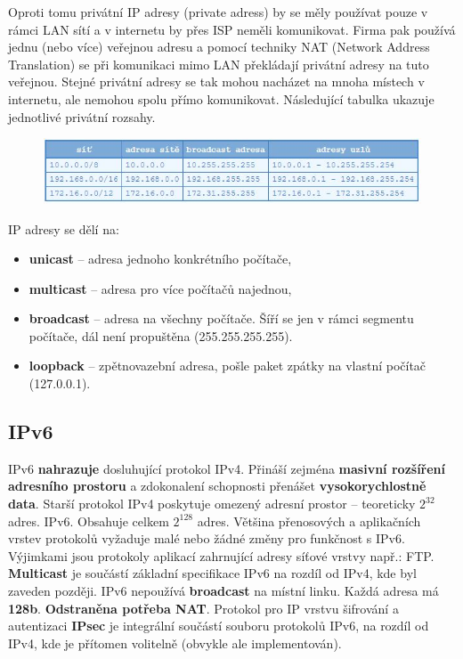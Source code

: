 Oproti tomu privátní IP adresy (private adress) by se měly používat pouze v rámci LAN sítí a v internetu by přes ISP neměli komunikovat. Firma pak používá jednu (nebo více) veřejnou adresu a pomocí techniky NAT (Network Address Translation) se při komunikaci mimo LAN překládají privátní adresy na tuto veřejnou. Stejné privátní adresy se tak mohou nacházet na mnoha místech v internetu, ale nemohou spolu přímo komunikovat. Následující tabulka ukazuje jednotlivé privátní rozsahy.
\begin{figure}[H]
\centering
\includegraphics[width=1\textwidth]{assets/6_ip4}
\end{figure}

IP adresy se dělí na:
\begin{itemize}
\item \textbf{unicast} -- adresa jednoho konkrétního počítače,
\item \textbf{multicast} -- adresa pro více počítačů najednou,
\item \textbf{broadcast} -- adresa na všechny počítače. Šíří se jen v rámci segmentu počítače, dál není propuštěna (255.255.255.255).
\item \textbf{loopback} -- zpětnovazební adresa, pošle paket zpátky na vlastní počítač (127.0.0.1).
\end{itemize}

\subsection{IPv6}
IPv6 \textbf{nahrazuje} dosluhující protokol IPv4. Přináší zejména \textbf{masivní rozšíření adresního prostoru} a zdokonalení schopnosti přenášet \textbf{vysokorychlostně data}. Starší protokol IPv4 poskytuje omezený adresní prostor – teoreticky $2^{32}$ adres. IPv6. Obsahuje celkem $2^{128}$ adres. Většina přenosových a aplikačních vrstev protokolů vyžaduje malé nebo žádné změny pro funkčnost s IPv6. Výjimkami jsou protokoly aplikací zahrnující adresy síťové vrstvy např.: FTP. \textbf{Multicast} je součástí základní specifikace IPv6 na rozdíl od IPv4, kde byl zaveden později. IPv6 nepoužívá \textbf{broadcast} na místní linku. Každá adresa má \textbf{128b}. \textbf{Odstraněna potřeba NAT}. Protokol pro IP vrstvu šifrování a autentizaci \textbf{IPsec} je integrální součástí souboru protokolů IPv6, na rozdíl od IPv4, kde je přítomen volitelně (obvykle ale implementován).

